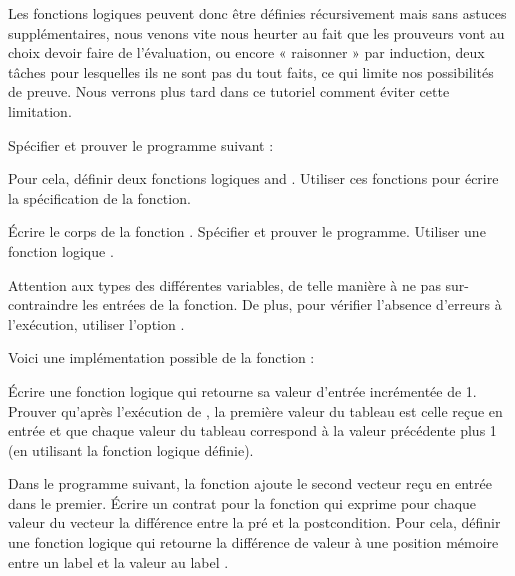 Les fonctions logiques peuvent donc être définies récursivement mais sans astuces
supplémentaires, nous venons vite nous heurter au fait que les prouveurs vont au 
choix devoir faire de l'évaluation, ou encore « raisonner » par induction, deux 
tâches pour lesquelles ils ne sont pas du tout faits, ce qui limite nos 
possibilités de preuve. Nous verrons plus tard dans ce tutoriel comment éviter
cette limitation.






Spécifier et prouver le programme suivant :




Pour cela, définir deux fonctions logiques  and .
Utiliser ces fonctions pour écrire la spécification de la fonction.




Écrire le corps de la fonction . Spécifier et prouver le
programme. Utiliser une fonction logique .




Attention aux types des différentes variables, de telle manière à ne pas
sur-contraindre les entrées de la fonction. De plus, pour vérifier l'absence
d'erreurs à l'exécution, utiliser l'option .




Voici une implémentation possible de la fonction  :




Écrire une fonction logique qui retourne sa valeur d'entrée incrémentée de 1. 
Prouver qu'après l'exécution de , la première valeur du tableau
est celle reçue en entrée et que chaque valeur du tableau correspond à la valeur
précédente plus 1 (en utilisant la fonction logique définie).






Dans le programme suivant, la fonction  ajoute le second
vecteur reçu en entrée dans le premier. Écrire un contrat pour la fonction
 qui exprime pour chaque valeur du vecteur
 la différence entre la pré et la postcondition. Pour cela,
définir une fonction logique  qui retourne la différence de
valeur à une position mémoire entre un label  et la valeur au
label .



